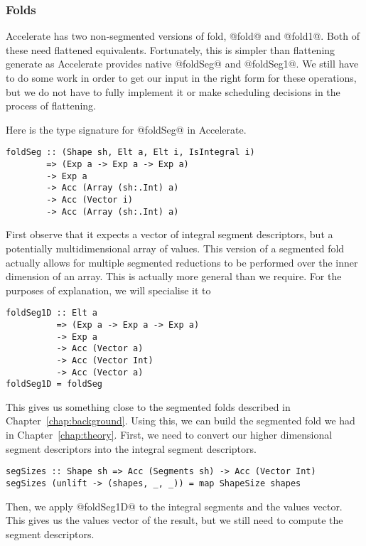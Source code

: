 \subsubsection{Folds}
Accelerate has two non-segmented versions of fold, @fold@ and @fold1@. Both of these need flattened equivalents. Fortunately, this is simpler than flattening generate as Accelerate provides native @foldSeg@ and @foldSeg1@. We still have to do some work in order to get our input in the right form for these operations, but we do not have to fully implement it or make scheduling decisions in the process of flattening.

Here is the type signature for @foldSeg@ in Accelerate.
%
\begin{lstlisting}
foldSeg :: (Shape sh, Elt a, Elt i, IsIntegral i)
        => (Exp a -> Exp a -> Exp a)
        -> Exp a
        -> Acc (Array (sh:.Int) a)
        -> Acc (Vector i)
        -> Acc (Array (sh:.Int) a)
\end{lstlisting}
%
First observe that it expects a vector of integral segment descriptors, but a potentially multidimensional array of values. This version of a segmented fold actually allows for multiple segmented reductions to be performed over the inner dimension of an array. This is actually more general than we require. For the purposes of explanation, we will specialise it to
%
\begin{lstlisting}
foldSeg1D :: Elt a
          => (Exp a -> Exp a -> Exp a)
          -> Exp a
          -> Acc (Vector a)
          -> Acc (Vector Int)
          -> Acc (Vector a)
foldSeg1D = foldSeg
\end{lstlisting}
%
This gives us something close to the segmented folds described in Chapter~\ref{chap:background}. Using this, we can build the segmented fold we had in Chapter~\ref{chap:theory}. First, we need to convert our higher dimensional segment descriptors into the integral segment descriptors.
%
\begin{lstlisting}
segSizes :: Shape sh => Acc (Segments sh) -> Acc (Vector Int)
segSizes (unlift -> (shapes, _, _)) = map ShapeSize shapes
\end{lstlisting}
%
Then, we apply @foldSeg1D@ to the integral segments and the values vector. This gives us the values vector of the result, but we still need to compute the segment descriptors.

